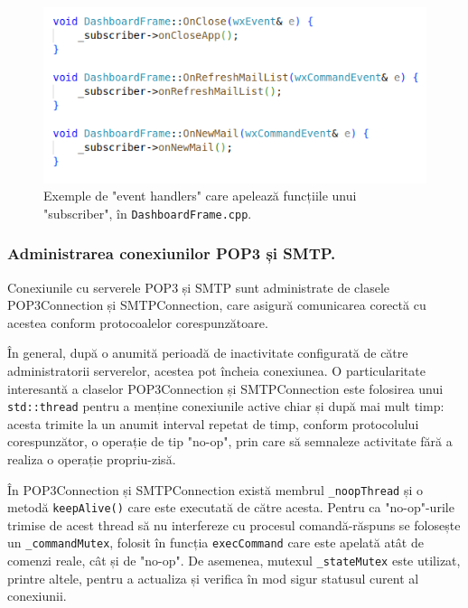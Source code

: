 \documentclass[runningheads]{llncs}
\begin{document}
\begin{figure}
    \centering
    \includegraphics[width=\textwidth]{subscriberFxns.png}
    \caption{Exemple de "event handlers" care apelează funcțiile unui "subscriber", în \texttt{DashboardFrame.cpp}.}
    \label{fig:subscribers}
\end{figure}


\newpage

\subsubsection{Administrarea conexiunilor POP3 și SMTP.}

Conexiunile cu serverele POP3 și SMTP sunt administrate de clasele POP3Connection și SMTPConnection, care asigură comunicarea corectă cu acestea conform protocoalelor corespunzătoare. 

În general, după o anumită perioadă de inactivitate configurată de către administratorii serverelor, acestea pot încheia conexiunea. O particularitate interesantă a claselor POP3Connection și SMTPConnection este folosirea unui \texttt{std::thread} pentru a menține conexiunile active chiar și după mai mult timp: acesta trimite la un anumit interval repetat de timp, conform protocolului corespunzător, o operație de tip "no-op", prin care să semnaleze activitate fără a realiza o operație propriu-zisă.

În POP3Connection și SMTPConnection există membrul \texttt{\_noopThread} și o metodă \texttt{keepAlive()} care este executată de către acesta. Pentru ca "no-op"-urile trimise de acest thread să nu interfereze cu procesul comandă-răspuns se folosește un \texttt{\_commandMutex}, folosit în funcția \texttt{execCommand} care este apelată atât de comenzi reale, cât și de "no-op". De asemenea, mutexul \texttt{\_stateMutex} este utilizat, printre altele, pentru a actualiza și verifica în mod sigur statusul curent al conexiunii.
\end{document}
